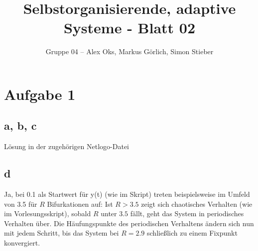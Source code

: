 \documentclass[10pt]{article}%
\theoremstyle{nonumberplain}
\begin{document}
\author{Gruppe 04 -- Alex Oks, Markus Görlich, Simon Stieber}
\title{Selbstorganisierende, adaptive Systeme - Blatt 02}

\maketitle %
\section{Aufgabe 1}
\subsection{a, b, c}
Lösung in der zugehörigen Netlogo-Datei
\subsection{d}
Ja, bei 0.1 als Startwert für y(t) (wie im Skript) treten beispielsweise im Umfeld von 3.5 für $R$ Bifurkationen auf: Ist $R>3.5$ zeigt sich chaotisches Verhalten (wie im Vorlesungsskript), sobald $R$ unter $3.5$ fällt, geht das System in periodisches Verhalten über. Die Häufungspunkte des periodischen Verhaltens ändern sich nun mit jedem Schritt, bis das System bei $R=2.9$ schließlich zu einem Fixpunkt konvergiert.
\end{document}
